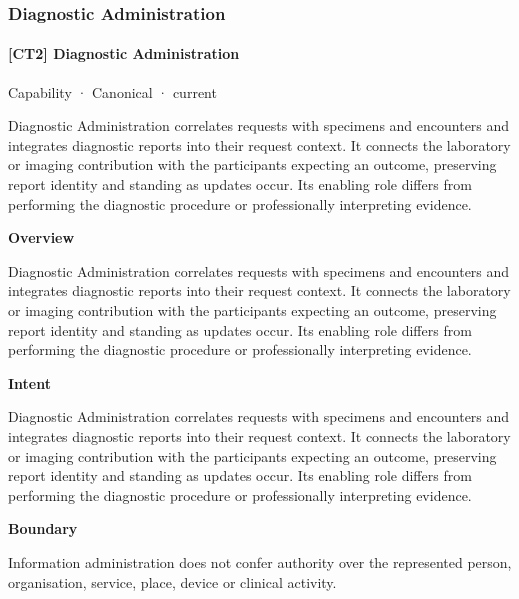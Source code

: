 \subsubsection{Diagnostic Administration}

\paragraph{[CT2] Diagnostic Administration}

\label{element:3cc720ba2e8b4d7a94bb349391d61895}
{\small Capability · Canonical · current}\par

Diagnostic Administration correlates requests with specimens and encounters and integrates diagnostic reports into their request context. It connects the laboratory or imaging contribution with the participants expecting an outcome, preserving report identity and standing as updates occur. Its enabling role differs from performing the diagnostic procedure or professionally interpreting evidence.



\textbf{Overview}



Diagnostic Administration correlates requests with specimens and encounters and integrates diagnostic reports into their request context. It connects the laboratory or imaging contribution with the participants expecting an outcome, preserving report identity and standing as updates occur. Its enabling role differs from performing the diagnostic procedure or professionally interpreting evidence.



\textbf{Intent}



Diagnostic Administration correlates requests with specimens and encounters and integrates diagnostic reports into their request context. It connects the laboratory or imaging contribution with the participants expecting an outcome, preserving report identity and standing as updates occur. Its enabling role differs from performing the diagnostic procedure or professionally interpreting evidence.



\textbf{Boundary}



Information administration does not confer authority over the represented person, organisation, service, place, device or clinical activity.



